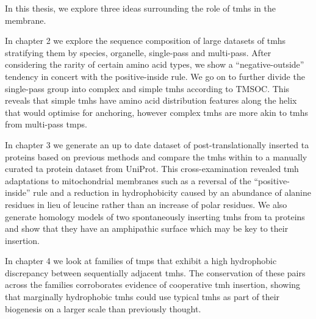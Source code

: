 In this thesis, we explore three ideas surrounding the role of \gls{tmh}s in the membrane.

In chapter 2 we explore the sequence composition of large datasets of \gls{tmh}s stratifying them by species, organelle, single\--pass and multi\--pass.
After considering the rarity of certain amino acid types, we show a ``negative\--outside'' tendency in concert with the positive\--inside rule.
We go on to further divide the single\--pass group into complex and simple \gls{tmh}s according to TMSOC.
This reveals that simple \gls{tmh}s have amino acid distribution features along the helix that would optimise for anchoring, however complex \gls{tmh}s are more akin to \gls{tmh}s from multi\--pass \gls{tmp}s.

In chapter 3 we generate an up to date dataset of post\--translationally inserted \gls{ta} proteins based on previous methods and compare the \gls{tmh}s within to a manually curated \gls{ta} protein dataset from UniProt.
This cross\--examination revealed \gls{tmh} adaptations to mitochondrial membranes such as a reversal of the ``positive\--inside'' rule and a reduction in hydrophobicity caused by an abundance of alanine residues in lieu of leucine rather than an increase of polar residues.
We also generate homology models of two spontaneously inserting \gls{tmh}s from \gls{ta} proteins and show that they have an amphipathic surface which may be key to their insertion.

In chapter 4 we look at families of \gls{tmp}s that exhibit a high hydrophobic discrepancy between sequentially adjacent \gls{tmh}s.
The conservation of these pairs across the families corroborates evidence of cooperative \gls{tmh} insertion, showing that marginally hydrophobic \gls{tmh}s could use typical \gls{tmh}s as part of their biogenesis on a larger scale than previously thought.
